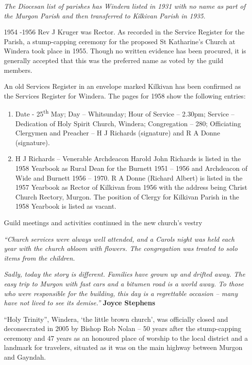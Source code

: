 \emph{The Diocesan list of parishes has Windera listed in 1931 with no
name as part of the Murgon Parish and then transferred to Kilkivan
Parish in 1935.}

1954 -1956 Rev J Kruger was Rector. As recorded in the Service Register
for the Parish, a stump-capping ceremony for the proposed St Katharine's
Church at Windera took place in 1955. Though no written evidence has
been procured, it is generally accepted that this was the preferred name
as voted by the guild members.

An old Services Register in an envelope marked Kilkivan has been
confirmed as the Services Register for Windera. The pages for 1958 show
the following entries:

\begin{enumerate}
\def\labelenumi{\arabic{enumi}.}
\item
  Date - 25\textsuperscript{th} May; Day -- Whitsunday; Hour of Service
  -- 2.30pm; Service -- Dedication of Holy Spirit Church, Windera;
  Congregation -- 280; Officiating Clergymen and Preacher -- H J
  Richards (signature) and R A Donne (signature).
\item
  H J Richards -- Venerable Archdeacon Harold John Richards is listed in
  the 1958 Yearbook as Rural Dean for the Burnett 1951 -- 1956 and
  Archdeacon of Wide and Burnett 1956 -- 1970. R A Donne (Richard
  Albert) is listed in the 1957 Yearbook as Rector of Kilkivan from 1956
  with the address being Christ Church Rectory, Murgon. The position of
  Clergy for Kilkivan Parish in the 1958 Yearbook is listed as vacant.
\end{enumerate}

Guild meetings and activities continued in the new church's vestry

\emph{``Church services were always well attended, and a Carols night
was held each year with the church abloom with flowers. The congregation
was treated to solo items from the children.}

\emph{Sadly, today the story is different. Families have grown up and
drifted away. The easy trip to Murgon with fast cars and a bitumen road
is a world away. To those who were responsible for the building, this
day is a regrettable occasion -- many have not lived to see its
demise.''} \textbf{Joyce Stephens}

``Holy Trinity'', Windera, `the little brown church', was officially
closed and deconsecrated in 2005 by Bishop Rob Nolan -- 50 years after
the stump-capping ceremony and 47 years as an honoured place of worship
to the local district and a landmark for travelers, situated as it was
on the main highway between Murgon and Gayndah.

